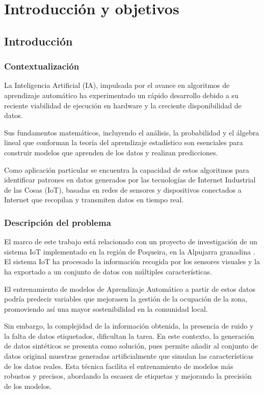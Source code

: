 \chapter{Introducción y objetivos}

\section{Introducción}

\subsection{Contextualización}

La Inteligencia Artificial (IA), impulsada por el avance en algoritmos de
aprendizaje automático ha experimentado un rápido desarrollo debido a su
reciente viabilidad de ejecución en hardware y la creciente disponibilidad de
datos. 

Sus fundamentos matemáticos, incluyendo el análisis, la probabilidad
y el álgebra lineal que conforman la teoría del aprendizaje estadístico
son esenciales para construir modelos que aprenden de los datos y realizan predicciones. 

Como aplicación particular se encuentra la capacidad de estos algoritmos para
identificar patrones en datos generados por las tecnologías de Internet
Industrial de las Cosas (IoT), basadas en redes de sensores y dispositivos
conectados a Internet que recopilan y transmiten datos en tiempo real.

\subsection{Descripción del problema}

El marco de este trabajo está relacionado con un proyecto de investigación de un sistema IoT
implementado en la región de Poqueira, en la Alpujarra granadina \cite{smartpoqueira}.
El sistema IoT ha procesado la información recogida por los sensores visuales
y la ha exportado a un conjunto de datos con múltiples características.

El entrenamiento de modelos de Aprendizaje Automático a partir de estos datos podría
predecir variables que mejorasen la gestión de la ocupación de la zona,
promoviendo así una mayor sostenibilidad en la comunidad local.

Sin embargo, la complejidad de la información obtenida, la presencia de ruido y
la falta de datos etiquetados, dificultan la tarea. En este contexto, la
generación de datos sintéticos se presenta como solución, pues 
permite añadir al conjunto de datos original muestras generadas artificialmente que
simulan las características de los datos reales. Esta
técnica facilita el entrenamiento de modelos más robustos y precisos, abordando
la escasez de etiquetas y mejorando la precisión de los modelos.

